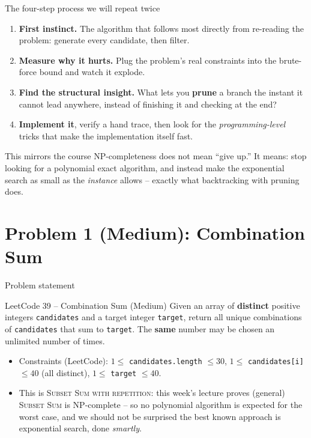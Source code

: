 \documentclass[11pt,aspectratio=169]{beamer}
\begin{document}
\begin{frame}{The four-step process we will repeat twice}
  \begin{enumerate}
    \item \textbf{First instinct.} The algorithm that follows most directly from
    re-reading the problem: generate every candidate, then filter.
    \item \textbf{Measure why it hurts.} Plug the problem's real constraints into the
    brute-force bound and watch it explode.
    \item \textbf{Find the structural insight.} What lets you \textbf{prune} a branch
    the instant it cannot lead anywhere, instead of finishing it and checking at the
    end?
    \item \textbf{Implement it}, verify a hand trace, then look for the
    \emph{programming-level} tricks that make the implementation itself fast.
  \end{enumerate}
  \begin{alertblock}{This mirrors the course}
    NP-completeness does not mean ``give up.'' It means: stop looking for a polynomial
    exact algorithm, and instead make the exponential search as small as the
    \emph{instance} allows -- exactly what backtracking with pruning does.
  \end{alertblock}
\end{frame}

\section{Problem 1 (Medium): Combination Sum}

\begin{frame}{Problem statement}
  \begin{block}{LeetCode 39 -- Combination Sum (\textcolor{blue!50!black}{Medium})}
    Given an array of \textbf{distinct} positive integers \texttt{candidates} and a
    target integer \texttt{target}, return all unique combinations of
    \texttt{candidates} that sum to \texttt{target}. The \textbf{same} number may be
    chosen an unlimited number of times.
  \end{block}
  \begin{itemize}
    \item Constraints (LeetCode): $1 \le$ \texttt{candidates.length} $\le 30$,
    $1 \le$ \texttt{candidates[i]} $\le 40$ (all distinct), $1 \le$ \texttt{target}
    $\le 40$.
    \item This is \textsc{Subset Sum with repetition}: this week's lecture proves
    (general) \textsc{Subset Sum} is NP-complete -- so no polynomial algorithm is
    expected for the worst case, and we should not be surprised the best known approach
    is exponential search, done \emph{smartly}.
  \end{itemize}
\end{frame}
\end{document}

